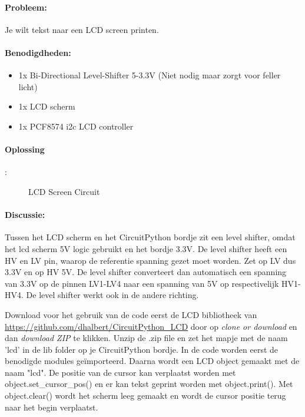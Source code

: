 \paragraph{Probleem:} Je wilt tekst naar een LCD screen printen.
\paragraph{Benodigdheden:}
	\begin{itemize}
		\item 1x Bi-Directional Level-Shifter 5-3.3V (Niet nodig maar zorgt voor feller licht)
		\item 1x LCD scherm
		\item 1x PCF8574 i2c LCD controller
	\end{itemize}
\paragraph{Oplossing}:
\begin{figure}[!htb]
	\caption{LCD Screen Circuit}
	\label{fig:LCD}
\end{figure}

\newpage
\paragraph{Discussie:} Tussen het LCD scherm en het CircuitPython bordje zit een level shifter, omdat het lcd scherm 5V logic gebruikt en het bordje 3.3V. De level shifter heeft een HV en LV pin, waarop de referentie spanning gezet moet worden. Zet op LV dus 3.3V en op HV 5V. De level shifter converteert dan automatisch een spanning van 3.3V op de pinnen LV1-LV4 naar een spanning van 5V op respectivelijk HV1-HV4. De level shifter werkt ook in de andere richting.

Download voor het gebruik van de code eerst de LCD bibliotheek van \url{https://github.com/dhalbert/CircuitPython_LCD} door op \textit{clone or download} en dan \textit{download ZIP} te klikken. Unzip de .zip file en zet het mapje met de naam 'lcd' in de lib folder op je CircuitPython bordje. In de code worden eerst de benodigde modules ge\"importeerd. Daarna wordt een LCD object gemaakt met de naam "lcd". De positie van de cursor kan verplaatst worden met object.set\_cursor\_pos() en er kan tekst geprint worden met object.print(). Met object.clear() wordt het scherm leeg gemaakt en wordt de cursor positie terug naar het begin verplaatst. \\

